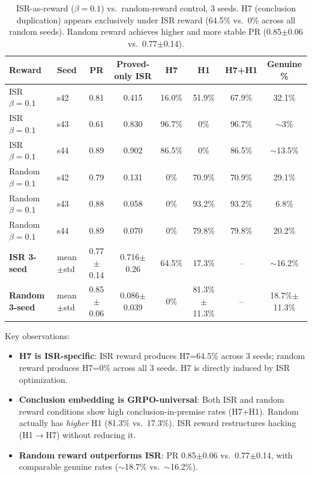 \documentclass[11pt,a4paper]{article}
\newcommand{\ISR}{\textsc{ISR}}
\begin{document}
\begin{table}[t]
\centering
\small
\begin{tabular}{llcccccc}
\toprule
\textbf{Reward} & \textbf{Seed} & \textbf{PR} & \textbf{Proved-only \ISR{}} & \textbf{H7} & \textbf{H1} & \textbf{H7+H1} & \textbf{Genuine \%} \\
\midrule
ISR $\beta{=}0.1$ & s42 & 0.81 & 0.415 & 16.0\% & 51.9\% & 67.9\% & 32.1\% \\
ISR $\beta{=}0.1$ & s43 & 0.61 & 0.830 & 96.7\% & 0\% & 96.7\% & $\sim$3\% \\
ISR $\beta{=}0.1$ & s44 & 0.89 & 0.902 & 86.5\% & 0\% & 86.5\% & $\sim$13.5\% \\
\midrule
Random $\beta{=}0.1$ & s42 & 0.79 & 0.131 & 0\% & 70.9\% & 70.9\% & 29.1\% \\
Random $\beta{=}0.1$ & s43 & 0.88 & 0.058 & 0\% & 93.2\% & 93.2\% & 6.8\% \\
Random $\beta{=}0.1$ & s44 & 0.89 & 0.070 & 0\% & 79.8\% & 79.8\% & 20.2\% \\
\midrule
\textbf{ISR 3-seed} & mean$\pm$std & 0.77$\pm$0.14 & 0.716$\pm$0.26 & 64.5\% & 17.3\% & -- & $\sim$16.2\% \\
\textbf{Random 3-seed} & mean$\pm$std & 0.85$\pm$0.06 & 0.086$\pm$0.039 & 0\% & 81.3\%$\pm$11.3\% & -- & 18.7\%$\pm$11.3\% \\
\bottomrule
\end{tabular}
\caption{ISR-as-reward ($\beta{=}0.1$) vs.\ random-reward control, 3 seeds. H7 (conclusion duplication) appears exclusively under ISR reward (64.5\% vs.\ 0\% across all random seeds). Random reward achieves higher and more stable PR (0.85$\pm$0.06 vs.\ 0.77$\pm$0.14).}
\label{tab:isr_reward_3seed}
\end{table}

Key observations:
\begin{itemize}
\item \textbf{H7 is ISR-specific}: ISR reward produces H7=64.5\% across 3 seeds; random reward produces H7=0\% across all 3 seeds. H7 is directly induced by ISR optimization.
\item \textbf{Conclusion embedding is GRPO-universal}: Both ISR and random reward conditions show high conclusion-in-premise rates (H7+H1). Random actually has \emph{higher} H1 (81.3\% vs.\ 17.3\%). ISR reward restructures hacking (H1$\to$H7) without reducing it.
\item \textbf{Random reward outperforms ISR}: PR 0.85$\pm$0.06 vs.\ 0.77$\pm$0.14, with comparable genuine rates ($\sim$18.7\% vs.\ $\sim$16.2\%).
\end{itemize}
\end{document}
